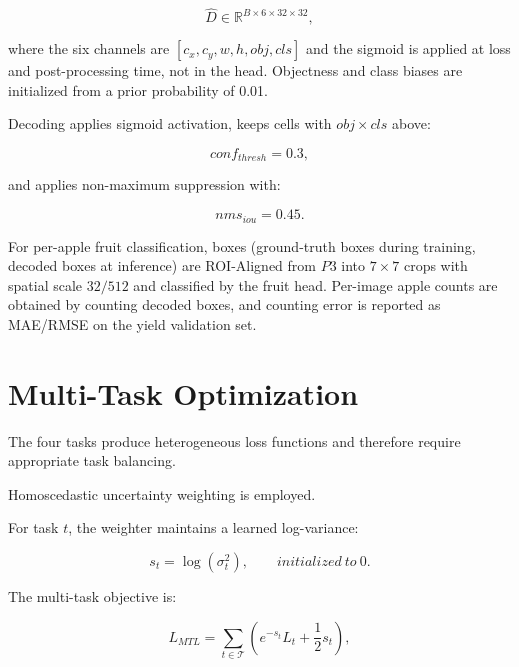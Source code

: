\documentclass[preprint,12pt]{elsarticle}
\begin{document}
\begin{equation}
\hat{D}
\in
\mathbb{R}^{B\times 6\times 32\times 32},
\end{equation}

where the six channels are $[c_x,c_y,w,h,obj,cls]$ and the sigmoid is
applied at loss and post-processing time, not in the head. Objectness
and class biases are initialized from a prior probability of 0.01.

Decoding applies sigmoid activation, keeps cells with
$obj\times cls$ above:

\begin{equation}
conf_{thresh}=0.3,
\end{equation}

and applies non-maximum suppression with:

\begin{equation}
nms_{iou}=0.45.
\end{equation}

For per-apple fruit classification, boxes (ground-truth boxes during
training, decoded boxes at inference) are ROI-Aligned from $P3$ into
$7\times7$ crops with spatial scale $32/512$ and classified by the
fruit head. Per-image apple counts are obtained by counting decoded
boxes, and counting error is reported as MAE/RMSE on the yield
validation set.


\section{Multi-Task Optimization}
\label{sec:optimization}

The four tasks produce heterogeneous loss functions and therefore
require appropriate task balancing.

Homoscedastic uncertainty weighting is employed.

For task $t$, the weighter maintains a learned log-variance:

\begin{equation}
s_t=\log(\sigma_t^2),
\qquad initialized\ to\ 0.
\end{equation}

The multi-task objective is:

\begin{equation}
L_{MTL}
=
\sum_{t\in\mathcal{T}}
\left(
e^{-s_t}L_t
+
\frac{1}{2}s_t
\right),
\end{equation}
\end{document}
